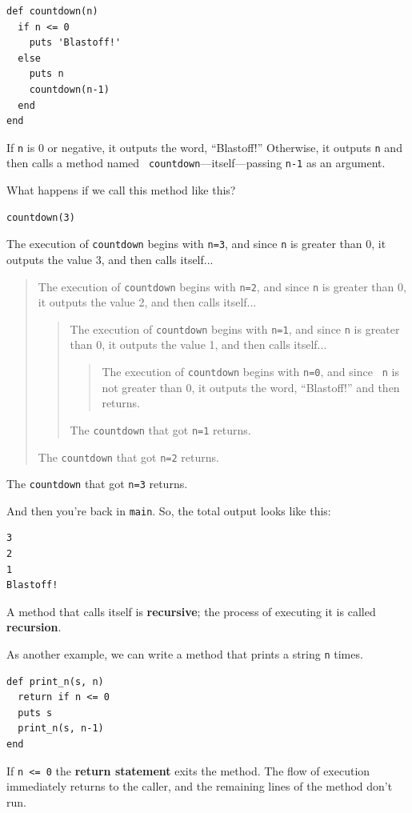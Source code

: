 \documentclass[10pt]{book}
\begin{document}
\begin{verbatim}
def countdown(n)
  if n <= 0
    puts 'Blastoff!'
  else
    puts n
    countdown(n-1)
  end
end
\end{verbatim}
%
If {\tt n} is 0 or negative, it outputs the word, ``Blastoff!''
Otherwise, it outputs {\tt n} and then calls a method named {\tt
countdown}---itself---passing {\tt n-1} as an argument.

What happens if we call this method like this?

\begin{verbatim}
countdown(3)
\end{verbatim}
%
The execution of {\tt countdown} begins with {\tt n=3}, and since
{\tt n} is greater than 0, it outputs the value 3, and then calls itself...

\begin{quote}
The execution of {\tt countdown} begins with {\tt n=2}, and since
{\tt n} is greater than 0, it outputs the value 2, and then calls itself...

\begin{quote}
The execution of {\tt countdown} begins with {\tt n=1}, and since
{\tt n} is greater than 0, it outputs the value 1, and then calls itself...

\begin{quote}
The execution of {\tt countdown} begins with {\tt n=0}, and since {\tt
n} is not greater than 0, it outputs the word, ``Blastoff!'' and then
returns.
\end{quote}

The {\tt countdown} that got {\tt n=1} returns.
\end{quote}

The {\tt countdown} that got {\tt n=2} returns.
\end{quote}

The {\tt countdown} that got {\tt n=3} returns.

And then you're back in \verb"main".  So, the
total output looks like this:

\begin{verbatim}
3
2
1
Blastoff!
\end{verbatim}
%
A method that calls itself is {\bf recursive}; the process of
executing it is called {\bf recursion}.

As another example, we can write a method that prints a
string {\tt n} times.

\begin{verbatim}
def print_n(s, n)
  return if n <= 0
  puts s
  print_n(s, n-1)
end
\end{verbatim}
%
If {\tt n <= 0} the {\bf return statement} exits the method.  The
flow of execution immediately returns to the caller, and the remaining
lines of the method don't run.
\end{document}
